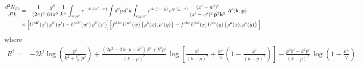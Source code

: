 \documentclass[9pt]{article}
\numberwithin{equation}{section}
\begin{document}
\begin{align}
\frac{d^{3}N_{2\,b}}{d^{3}k} & = -\frac{1}{(2\pi)^{3}}\,\frac{g^{4}}{64\pi^{6}}\,\frac{1}{k^{+}}\int_{w,w'} e^{-ik\cdot(w'-w)}
\int d^{2}p\,d^{2}k\int_{x,y{\color{blue},x'}} e^{ik\cdot(w-y)}\,e^{ip\cdot(y-x)}\,\frac{(x'-w')^{i}}{(x'-w')^{2}\,\mathbf{p}^{2}\mathbf{k}^{2}}\;R^{i}(\mathbf{k},\mathbf{p})\notag\\
&\times\Big[U^{ab'}(x')\,\rho^{b'}(x')-U^{ab'}(w')\,\rho^{b'}(x')\Big]
\Big[f^{hbc}\,U^{ah}(w)\left\{\rho^{b}(x),\rho^{c}(y)\right\}-f^{abc}\,U^{bd}(x)\,U^{ce}(y)\left\{\rho^{d}(x),\rho^{e}(y)\right\}\Big]
\end{align}
where
\begin{align}
R^{i} =& -2k^{i}\log\left(\frac{p^{2}}{k^{2}+\frac{k^{+}}{\vee}\,p^{2}}\right)
+\frac{(2p^{2}-2\,k\cdot p+k^{2})\,k^{i}+k^{2}p^{i}}{(k-p)^{2}}\,
\log\left[\frac{k^{2}}{(k-p)^{2}}+\frac{k^{+}}{\vee}\left(1-\frac{k^{2}}{(k-p)^{2}}\right)\right]
-\frac{p^{2}k^{i}+k^{2}p^{i}}{(k-p)^{2}}\,\log\left(1-\frac{k^{+}}{\vee}\right).
\end{align}
\end{document}

